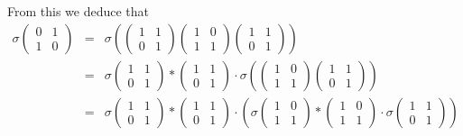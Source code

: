 From this we deduce that
\begin{eqnarray*}
\sigma\left(\begin{matrix} 0 & 1 \\ 1 & 0 \end{matrix}\right) &=&
\sigma\left(
\left(\begin{matrix} 1 & 1 \\ 0 & 1 \end{matrix}\right)
\left(\begin{matrix} 1 & 0 \\ 1 & 1 \end{matrix}\right)
\left(\begin{matrix} 1 & 1 \\ 0 & 1 \end{matrix}\right)
\right) \\
&=&
\sigma
\left(\begin{matrix} 1 & 1 \\ 0 & 1 \end{matrix}\right)
*
\left(\begin{matrix} 1 & 1 \\ 0 & 1 \end{matrix}\right)
\cdot
\sigma\left(
\left(\begin{matrix} 1 & 0 \\ 1 & 1 \end{matrix}\right)
\left(\begin{matrix} 1 & 1 \\ 0 & 1 \end{matrix}\right)
\right) \\
&=&
\sigma
\left(\begin{matrix} 1 & 1 \\ 0 & 1 \end{matrix}\right)
*
\left(\begin{matrix} 1 & 1 \\ 0 & 1 \end{matrix}\right)
\cdot
\left(
\sigma\left(\begin{matrix} 1 & 0 \\ 1 & 1 \end{matrix}\right)
*
\left(\begin{matrix} 1 & 0 \\ 1 & 1 \end{matrix}\right)
\cdot
\sigma\left(\begin{matrix} 1 & 1 \\ 0 & 1 \end{matrix}\right)
\right) \\

\end{eqnarray*}
